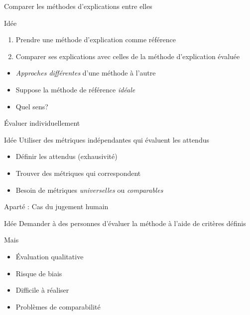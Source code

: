 \documentclass[french, 12pt, aspectratio=2013]{beamer}
\newcommand{\com}[1]{\textcolor{olive}{#1}}
\begin{document}
        \begin{frame}{Comparer les méthodes d'explications entre elles}
            \begin{block}{Idée}
                \begin{enumerate}
                    \item Prendre une méthode d'explication comme référence
                    \item Comparer ses explications avec celles de la méthode d'explication évaluée
                \end{enumerate}
            \end{block}
            \begin{itemize}
                \item \emph{Approches différentes} d'une méthode à l'autre
                \item Suppose la méthode de référence \emph{idéale}
                \item Quel sens? \cite{neely_song_2022}
            \end{itemize}
        \end{frame}
        
        \begin{frame}{Évaluer individuellement}
                \begin{block}{Idée}
                    Utiliser des métriques indépendantes qui évaluent les attendus
                \end{block}
                \begin{itemize}
                    \item Définir les attendus (exhausivité)
                    \item Trouver des métriques qui correspondent
                    \item Besoin de métriques \emph{universelles} ou \emph{comparables}
                \end{itemize}
        \end{frame}
        
        \begin{frame}{Aparté : Cas du jugement humain}
        \begin{block}{Idée }
            Demander à des personnes d'évaluer la méthode à l'aide de critères définis
        \end{block}
        Mais
        \begin{itemize}
            \item Évaluation qualitative
            \item Risque de biais \cite{gilpin_explaining_2019}
            \item Difficile à réaliser 
            \item Problèmes de comparabilité 
        \end{itemize}
    \end{frame}
    
\end{document}
